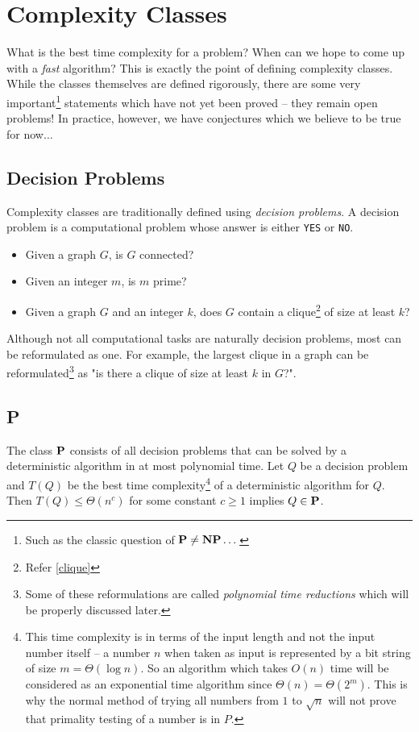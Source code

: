 \chapter{Complexity Classes}

What is the best time complexity for a problem? When can we hope 
to come up with a \emph{fast} algorithm? This is exactly the point of defining complexity classes. While 
the classes themselves are defined rigorously, there are some very 
important\footnote{Such as the classic question of $\mathbf{P} \neq \mathbf{NP} \dots$} statements which 
have not yet been proved -- they remain open problems! In practice, however, we have conjectures which we believe 
to be true for now$\dots$

\section{Decision Problems}
Complexity classes are traditionally defined using \emph{decision problems}. A decision problem is a 
computational problem whose answer is either \texttt{YES} or \texttt{NO}.

\begin{itemize}
\item Given a graph $G$, is $G$ connected?
\item Given an integer $m$, is $m$ prime?
\item Given a graph $G$ and an integer $k$, does $G$ contain a clique\footnote{Refer \autoref{clique}} of 
size at least $k$?
\end{itemize}

Although not all computational tasks are naturally decision problems, most can be 
reformulated as one. For example, the largest clique in a graph can be reformulated\footnote{Some 
of these reformulations are called \emph{polynomial time reductions} which will be properly discussed later.} as 
"is there a clique of size at least $k$ in $G$?". 


\section{P}

The class $\mathbf{P}$ consists of all decision problems that can be solved by a 
deterministic algorithm in at most polynomial time. Let $Q$ be a decision problem and $T(Q)$ be the best
time complexity\footnote{This time complexity is in terms of the input length 
and not the input number itself -- a number $n$ when taken as input is represented by 
a bit string of size $m=\Theta(\log n)$. So an algorithm which takes $O(n)$ time will be considered 
as an exponential time algorithm since $\Theta(n) = \Theta(2^m)$. This is why the normal method of 
trying all numbers from $1$ to $\sqrt n$ will not prove that primality testing of a number is in $P$.} 
of a deterministic algorithm for $Q$. Then $T(Q) \le \Theta(n^c)$ for some constant $c\ge1$ 
implies $Q \in \mathbf{P}$.

